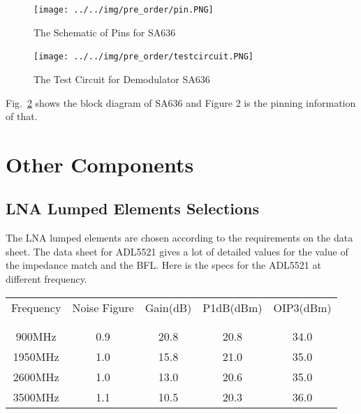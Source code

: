 \documentclass[]{article}
\begin{document}
            \begin{figure}[p]
                \begin{center}
                    \texttt{[image: ../../img/pre\_order/pin.PNG]}~
                    \label{Pins of the ADL5521}
                    \caption{The Schematic of Pins for SA636}
                \end{center}
            \end{figure}

            \begin{figure}[p]
                \begin{center}
                    \texttt{[image: ../../img/pre\_order/testcircuit.PNG]}~
                    \label{Testcircuits}
                    \caption{The Test Circuit for Demodulator SA636}
                \end{center}
            \end{figure}

            Fig.~\ref{Testcircuits} shows the block diagram of SA636 and Figure
            2 is the pinning information of that. 
        
\section{Other Components}
    
    \subsection{LNA Lumped Elements Selections} 
        The LNA lumped elements are chosen according to the requirements on the
        data sheet. The data sheet for ADL5521 gives a lot of detailed values
        for the value of the impedance match and the BFL.  Here is the specs for
        the ADL5521 at different frequency.

        \begin{center}
            \begin{tabular}{c c c c c}
                Frequency & Noise Figure & Gain(dB) & P1dB(dBm) & OIP3(dBm) \\ \\ \hline \\
                900MHz & 0.9 & 20.8 & 20.8 & 34.0\\
                1950MHz & 1.0 & 15.8 & 21.0 & 35.0\\
                2600MHz & 1.0 & 13.0 & 20.6 & 35.0\\
                3500MHz & 1.1 & 10.5 & 20.3 & 36.0
            \end{tabular}
        \end{center}
\end{document}
